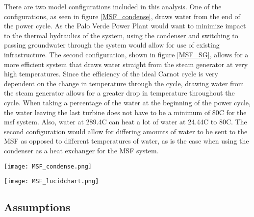 There are two model configurations included in this analysis.  One of the configurations, as seen in figure \ref{MSF_condense},  draws water from the end of the power cycle.  As the Palo Verde Power Plant would want to minimize impact to the thermal hydraulics of the system, using the condenser and switching to passing groundwater through the system would allow for use of existing infrastructure. The second configuration, shown in figure \ref{MSF_SG}, allows for a more efficient system that draws water straight from the steam generator at very high temperatures. Since the efficiency of the ideal Carnot cycle is very dependent on the change in temperature through the cycle, drawing water from the steam generator allows for a greater drop in temperature throughout the cycle.  When taking a percentage of the water at the beginning of the power cycle, the water leaving the last turbine does not have to be a minimum of 80\degree C for the \ac{msf} system.  Also, water at 289.4\degree C can heat a lot of water at 24.44\degree C to 80\degree C. The second configuration would allow for differing amounts of water to be sent to the MSF as opposed to different temperatures of water, as is the case when using the condenser as a heat exchanger for the MSF system.

\begin{figure*}[h!]
\centering
\texttt{[image: MSF\_condense.png]}
\caption{\small \sl This simplified drawing shows the main components of the power cycle including how the multistage flash distillation system is heated through the condenser}
 \label{MSF_condense}
\centering
\end{figure*}

\begin{figure*}[h!]
\centering
\texttt{[image: MSF\_lucidchart.png]}
\caption{\small \sl This simplified drawing shows the main components of the power cycle including how the multistage flash distillation system draws water just after the steam generator}
 \label{MSF_SG}
\centering
\end{figure*}

\clearpage



\clearpage
\subsection{Assumptions}

